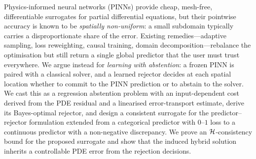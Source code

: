 Physics-informed neural networks (PINNs) provide cheap, mesh-free,
differentiable surrogates for partial differential equations, but their
pointwise accuracy is known to be \emph{spatially non-uniform}: a small
subdomain typically carries a disproportionate share of the error. Existing
remedies---adaptive sampling, loss reweighting, causal training, domain
decomposition---rebalance the optimisation but still return a single global
predictor that the user must trust everywhere. We argue instead for
\emph{learning with abstention}: a frozen PINN is paired with a classical
solver, and a learned rejector decides at each spatial location whether to
commit to the PINN prediction or to abstain to the solver. We cast this as
a regression abstention problem with an input-dependent cost derived from
the PDE residual and a linearised error-transport estimate, derive its
Bayes-optimal rejector, and design a consistent surrogate for the
predictor--rejector formulation extended from a categorical predictor with
$0$--$1$ loss to a continuous predictor with a non-negative discrepancy.
We prove an $\mathcal{H}$-consistency bound for the proposed surrogate and show
that the induced hybrid solution inherits a controllable PDE error from
the rejection decisions.
